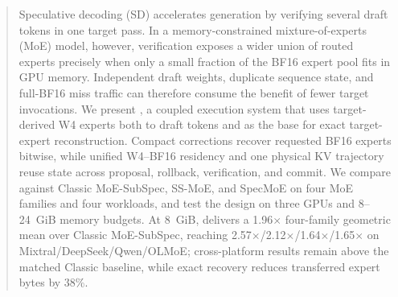 \begin{abstract}
Speculative decoding (SD) accelerates generation by verifying several draft tokens in
one target pass. In a memory-constrained mixture-of-experts (MoE) model, however,
verification exposes a wider union of routed experts precisely when only a small
fraction of the BF16 expert pool fits in GPU memory. Independent draft weights,
duplicate sequence state, and full-BF16 miss traffic can therefore consume the
benefit of fewer target invocations. We present \system, a coupled execution system
that uses target-derived W4 experts both to draft tokens and as the base for exact
target-expert reconstruction. Compact corrections recover requested BF16 experts
bitwise, while unified W4--BF16 residency and one physical KV trajectory reuse state
across proposal, rollback, verification, and commit. We compare against Classic
MoE-SubSpec, SS-MoE, and SpecMoE on four MoE families and four workloads, and test
the design on three GPUs and 8--24~GiB memory budgets. At 8~GiB, \system delivers a
1.96$\times$ four-family geometric mean over Classic MoE-SubSpec, reaching
2.57$\times$/2.12$\times$/1.64$\times$/1.65$\times$ on
Mixtral/DeepSeek/Qwen/OLMoE; cross-platform results remain above the matched Classic
baseline, while exact recovery reduces transferred expert bytes by 38\%.
\end{abstract}
